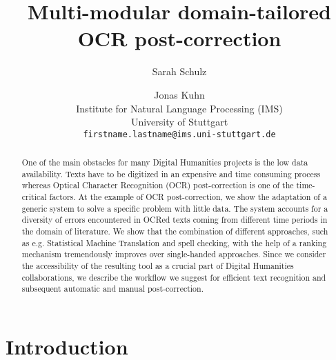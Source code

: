 \documentclass[11pt,letterpaper]{article}
\title{Multi-modular domain-tailored OCR post-correction}
\author{Sarah Schulz\and Jonas Kuhn\\
        Institute for Natural Language Processing (IMS)\\
        University of Stuttgart\\
  {\tt firstname.lastname@ims.uni-stuttgart.de}}
\date{}
\begin{document}
\maketitle

\begin{abstract}
One of the main obstacles for many Digital Humanities projects is the low data availability.
Texts have to be digitized in an expensive and time consuming process whereas Optical Character Recognition (OCR) post-correction
is one of the time-critical factors.
At the example of OCR post-correction, we show the adaptation of a generic 
system to solve a specific problem with little data. The system accounts for a diversity of errors 
encountered in OCRed texts coming from different time periods in the domain of literature. 
We show that the combination of different approaches, such as e.g. Statistical Machine Translation and spell checking,  with the help of a
ranking mechanism tremendously improves over single-handed approaches. 
Since we consider the accessibility of the resulting tool as a crucial part of Digital Humanities
collaborations, we describe the workflow we suggest for efficient text recognition and 
subsequent automatic and manual post-correction. 
\end{abstract}


\section{Introduction}
\end{document}

